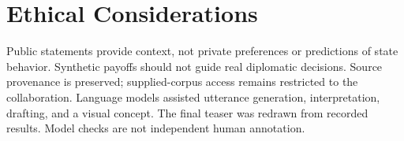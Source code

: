 \section*{Ethical Considerations}
Public statements provide context, not private preferences or predictions of state behavior. Synthetic payoffs should not guide real diplomatic decisions. Source provenance is preserved; supplied-corpus access remains restricted to the collaboration. Language models assisted utterance generation, interpretation, drafting, and a visual concept. The final teaser was redrawn from recorded results. Model checks are not independent human annotation.
